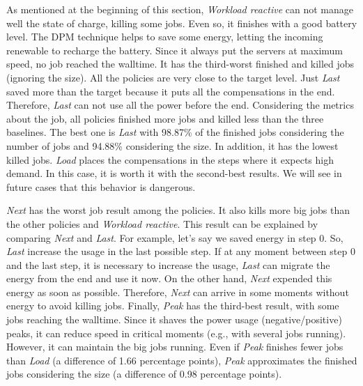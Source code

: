 As mentioned at the beginning of this section, \emph{Workload reactive} can not manage well the state of charge, killing some jobs. Even so, it finishes with a good battery level. The DPM technique helps to save some energy, letting the incoming renewable to recharge the battery. Since it always put the servers at maximum speed, no job reached the walltime. It has the third-worst finished and killed jobs (ignoring the size). All the policies are very close to the target level. Just \emph{Last} saved more than the target because it puts all the compensations in the end. Therefore, \emph{Last} can not use all the power before the end. Considering the metrics about the job, all policies finished more jobs and killed less than the three baselines. The best one is \emph{Last} with 98.87\% of the finished jobs considering the number of jobs and 94.88\% considering the size. In addition, it has the lowest killed jobs. \emph{Load} places the compensations in the steps where it expects high demand. In this case, it is worth it with the second-best results. We will see in future cases that this behavior is dangerous. 

\emph{Next} has the worst job result among the policies. It also kills more big jobs than the other policies and \emph{Workload reactive}. This result can be explained by comparing \emph{Next} and \emph{Last}. For example, let's say we saved energy in step 0. So, \emph{Last} increase the usage in the last possible step. If at any moment between step 0 and the last step, it is necessary to increase the usage, \emph{Last} can migrate the energy from the end and use it now. On the other hand, \emph{Next} expended this energy as soon as possible. Therefore, \emph{Next} can arrive in some moments without energy to avoid killing jobs. Finally, \emph{Peak} has the third-best result, with some jobs reaching the walltime. Since it shaves the power usage (negative/positive) peaks, it can reduce speed in critical moments (e.g., with several jobs running). However, it can maintain the big jobs running. Even if \emph{Peak} finishes fewer jobs than \emph{Load} (a difference of 1.66 percentage points), \emph{Peak} approximates the finished jobs considering the size (a difference of 0.98 percentage points).

